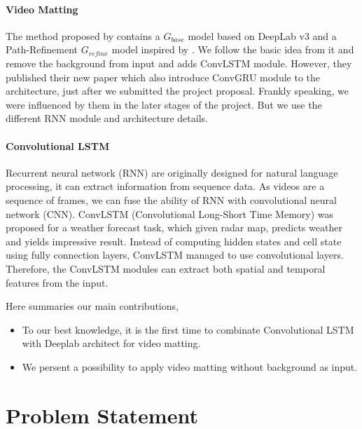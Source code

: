 \documentclass[final]{cvpr}
\begin{document}
\paragraph{Video Matting}

The method proposed by \cite{linRealTimeHighResolutionBackground2020a} contains a $G_{base}$ model based on DeepLab v3 and a Path-Refinement $G_{refine}$ model inspired by \cite{kirillovPointRendImageSegmentation2020}.
We follow the basic idea from it and remove the background from input and adds ConvLSTM module.
However, they published their new paper \cite{linRobustHighResolutionVideo2021} which also introduce ConvGRU module to the architecture, just after we submitted the project proposal.
Frankly speaking, we were influenced by them in the later stages of the project.
But we use the different RNN module and architecture details.

\paragraph{Convolutional LSTM}

Recurrent neural network (RNN) are originally designed for natural language processing, it can extract information from sequence data.
As videos are a sequence of frames, we can fuse the ability of RNN with convolutional neural network (CNN).
ConvLSTM (Convolutional Long-Short Time Memory) \cite{shiConvolutionalLSTMNetwork2015} was proposed for a weather forecast task, which given radar map, predicts weather and yields impressive result.
Instead of computing hidden states and cell state using fully connection layers, ConvLSTM managed to use convolutional layers.
Therefore, the ConvLSTM modules can extract both spatial and temporal features from the input.

Here summaries our main contributions,

\begin{itemize}
    \item To our best knowledge, it is the first time to combinate Convolutional LSTM with Deeplab architect for video matting.
    \item We persent a possibility to apply video matting without background as input.
\end{itemize}

\section{Problem Statement}
\end{document}
